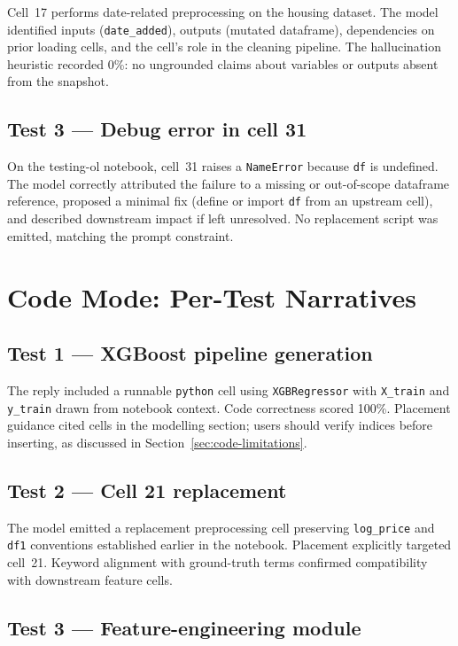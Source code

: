 Cell~17 performs date-related preprocessing on the housing dataset. The model identified inputs (\texttt{date\_added}), outputs (mutated dataframe), dependencies on prior loading cells, and the cell's role in the cleaning pipeline. The hallucination heuristic recorded 0\%: no ungrounded claims about variables or outputs absent from the snapshot.

\subsection{Test 3 --- Debug error in cell 31}

On the testing-ol notebook, cell~31 raises a \texttt{NameError} because \texttt{df} is undefined. The model correctly attributed the failure to a missing or out-of-scope dataframe reference, proposed a minimal fix (define or import \texttt{df} from an upstream cell), and described downstream impact if left unresolved. No replacement script was emitted, matching the prompt constraint.

\section{Code Mode: Per-Test Narratives}
\label{sec:code-detail}

\subsection{Test 1 --- XGBoost pipeline generation}

The reply included a runnable \texttt{python} cell using \texttt{XGBRegressor} with \texttt{X\_train} and \texttt{y\_train} drawn from notebook context. Code correctness scored 100\%. Placement guidance cited cells in the modelling section; users should verify indices before inserting, as discussed in Section~\ref{sec:code-limitations}.

\subsection{Test 2 --- Cell 21 replacement}

The model emitted a replacement preprocessing cell preserving \texttt{log\_price} and \texttt{df1} conventions established earlier in the notebook. Placement explicitly targeted cell~21. Keyword alignment with ground-truth terms confirmed compatibility with downstream feature cells.

\subsection{Test 3 --- Feature-engineering module}

